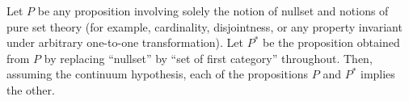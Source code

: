Let $P$ be any proposition involving solely the notion of nullset and notions of pure set theory (for example, cardinality, disjointness, or any property invariant under arbitrary one-to-one transformation). Let $P^*$ be the proposition obtained from $P$ by replacing ``nullset'' by ``set of first category'' throughout. Then, assuming the continuum hypothesis, each of the propositions $P$ and $P^*$ implies the other.
